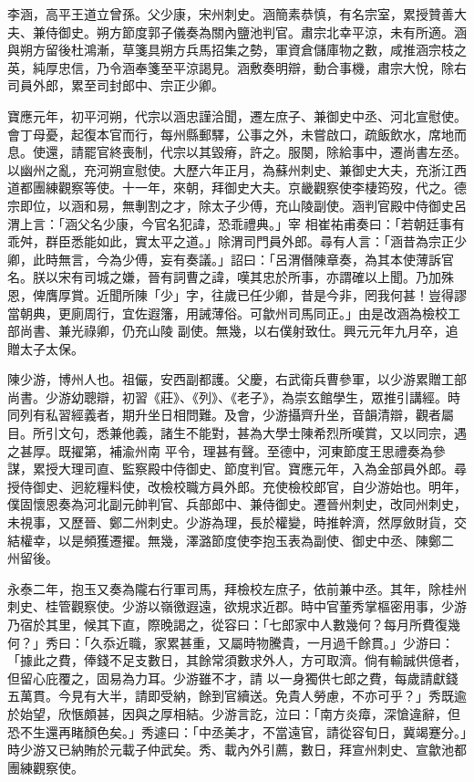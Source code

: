 \begin{pinyinscope}
 李涵，高平王道立曾孫。父少康，宋州刺史。涵簡素恭慎，有名宗室，累授贊善大夫、兼侍御史。朔方節度郭子儀奏為關內鹽池判官。肅宗北幸平涼，未有所適。涵與朔方留後杜鴻漸，草箋具朔方兵馬招集之勢，軍資倉儲庫物之數，咸推涵宗枝之英，純厚忠信，乃令涵奉箋至平涼謁見。涵敷奏明辯，動合事機，肅宗大悅，除右司員外郎，累至司封郎中、宗正少卿。



 寶應元年，初平河朔，代宗以涵忠謹洽聞，遷左庶子、兼御史中丞、河北宣慰使。
 會丁母憂，起復本官而行，每州縣郵驛，公事之外，未嘗啟口，疏飯飲水，席地而息。使還，請罷官終喪制，代宗以其毀瘠，許之。服闋，除給事中，遷尚書左丞。以幽州之亂，充河朔宣慰使。大歷六年正月，為蘇州刺史、兼御史大夫，充浙江西道都團練觀察等使。十一年，來朝，拜御史大夫。京畿觀察使李棲筠歿，代之。德宗即位，以涵和易，無剸割之才，除太子少傅，充山陵副使。涵判官殿中侍御史呂渭上言：「涵父名少康，今官名犯諱，恐乖禮典。」宰
 相崔祐甫奏曰：「若朝廷事有乖舛，群臣悉能如此，實太平之道。」除渭司門員外郎。尋有人言：「涵昔為宗正少卿，此時無言，今為少傅，妄有奏議。」詔曰：「呂渭僭陳章奏，為其本使薄訴官名。朕以宋有司城之嫌，晉有詞曹之諱，嘆其忠於所事，亦謂確以上聞。乃加殊恩，俾膺厚賞。近聞所陳「少」字，往歲已任少卿，昔是今非，罔我何甚！豈得謬當朝典，更廁周行，宜佐遐籓，用誡薄俗。可歙州司馬同正。」由是改涵為檢校工部尚書、兼光祿卿，仍充山陵
 副使。無幾，以右僕射致仕。興元元年九月卒，追贈太子太保。



 陳少游，博州人也。祖儼，安西副都護。父慶，右武衛兵曹參軍，以少游累贈工部尚書。少游幼聰辯，初習《莊》、《列》、《老子》，為崇玄館學生，眾推引講經。時同列有私習經義者，期升坐日相問難。及會，少游攝齊升坐，音韻清辯，觀者屬目。所引文句，悉兼他義，諸生不能對，甚為大學士陳希烈所嘆賞，又以同宗，遇之甚厚。既擢第，補渝州南
 平令，理甚有聲。至德中，河東節度王思禮奏為參謀，累授大理司直、監察殿中侍御史、節度判官。寶應元年，入為金部員外郎。尋授侍御史、迥紇糧料使，改檢校職方員外郎。充使檢校郎官，自少游始也。明年，僕固懷恩奏為河北副元帥判官、兵部郎中、兼侍御史。遷晉州刺史，改同州刺史，未視事，又歷晉、鄭二州刺史。少游為理，長於權變，時推幹濟，然厚斂財貨，交結權幸，以是頻獲遷擢。無幾，澤潞節度使李抱玉表為副使、御史中丞、陳鄭二
 州留後。



 永泰二年，抱玉又奏為隴右行軍司馬，拜檢校左庶子，依前兼中丞。其年，除桂州刺史、桂管觀察使。少游以嶺徼遐遠，欲規求近郡。時中官董秀掌樞密用事，少游乃宿於其里，候其下直，際晚謁之，從容曰：「七郎家中人數幾何？每月所費復幾何？」秀曰：「久忝近職，家累甚重，又屬時物騰貴，一月過千餘貫。」少游曰：「據此之費，俸錢不足支數日，其餘常須數求外人，方可取濟。倘有輸誠供億者，但留心庇覆之，固易為力耳。少游雖不才，請
 以一身獨供七郎之費，每歲請獻錢五萬貫。今見有大半，請即受納，餘到官續送。免貴人勞慮，不亦可乎？」秀既逾於始望，欣愜頗甚，因與之厚相結。少游言訖，泣曰：「南方炎瘴，深愴違辭，但恐不生還再睹顏色矣。」秀遽曰：「中丞美才，不當遠官，請從容旬日，冀竭蹇分。」時少游又已納賄於元載子仲武矣。秀、載內外引薦，數日，拜宣州刺史、宣歙池都團練觀察使。




\end{pinyinscope}
